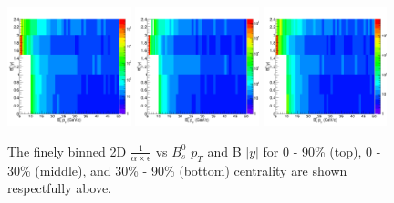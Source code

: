 \begin{figure}[h]
\begin{center}
\includegraphics[width= 0.32\textwidth]{Figures/Chapter5/BsEff2D_0_90.png}
\includegraphics[width= 0.32\textwidth]{Figures/Chapter5/BsEff2D_0_30.png}
\includegraphics[width= 0.32\textwidth]{Figures/Chapter5/BsEff2D_30_90.png}
\caption{The finely binned 2D $\frac{1}{\alpha \times \epsilon}$ vs $B^0_s$ $p_T$ and B $|y|$ for 0 - 90\% (top), 0 - 30\% (middle), and 30\% - 90\% (bottom) centrality are shown respectfully above.}
\label{Bs2DMap}
\end{center}
\end{figure}


